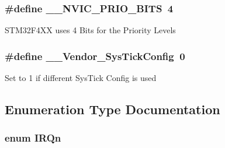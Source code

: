 \subsubsection[{\texorpdfstring{\+\_\+\+\_\+\+N\+V\+I\+C\+\_\+\+P\+R\+I\+O\+\_\+\+B\+I\+TS}{__NVIC_PRIO_BITS}}]{\setlength{\rightskip}{0pt plus 5cm}\#define \+\_\+\+\_\+\+N\+V\+I\+C\+\_\+\+P\+R\+I\+O\+\_\+\+B\+I\+TS~4}\hypertarget{group___configuration__section__for___c_m_s_i_s_gae3fe3587d5100c787e02102ce3944460}{}\label{group___configuration__section__for___c_m_s_i_s_gae3fe3587d5100c787e02102ce3944460}
S\+T\+M32\+F4\+XX uses 4 Bits for the Priority Levels 
\subsubsection[{\texorpdfstring{\+\_\+\+\_\+\+Vendor\+\_\+\+Sys\+Tick\+Config}{__Vendor_SysTickConfig}}]{\setlength{\rightskip}{0pt plus 5cm}\#define \+\_\+\+\_\+\+Vendor\+\_\+\+Sys\+Tick\+Config~0}\hypertarget{group___configuration__section__for___c_m_s_i_s_gab58771b4ec03f9bdddc84770f7c95c68}{}\label{group___configuration__section__for___c_m_s_i_s_gab58771b4ec03f9bdddc84770f7c95c68}
Set to 1 if different Sys\+Tick Config is used 

\subsection{Enumeration Type Documentation}
\subsubsection[{\texorpdfstring{I\+R\+Qn}{IRQn}}]{\setlength{\rightskip}{0pt plus 5cm}enum {\bf I\+R\+Qn}}\hypertarget{group___configuration__section__for___c_m_s_i_s_ga666eb0caeb12ec0e281415592ae89083}{}\label{group___configuration__section__for___c_m_s_i_s_ga666eb0caeb12ec0e281415592ae89083}


